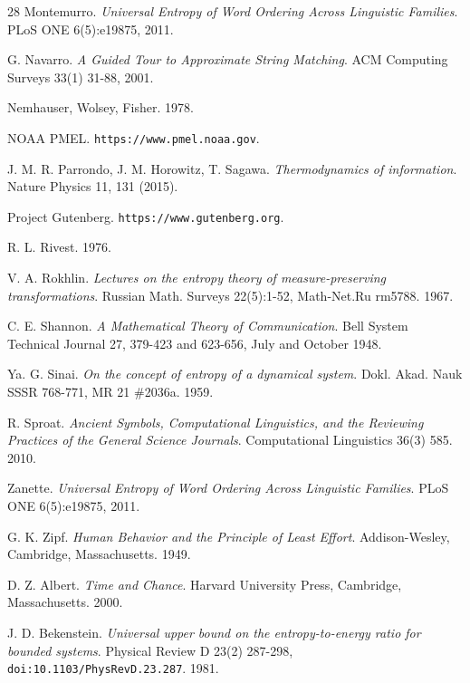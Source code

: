 \begin{thebibliography}{28}
Montemurro. \emph{Universal Entropy of Word Ordering Across Linguistic Families}. PLoS ONE 6(5):e19875, 2011.

G. Navarro. \emph{A Guided Tour to Approximate String Matching}. ACM Computing Surveys 33(1) 31-88, 2001.

Nemhauser, Wolsey, Fisher. 1978.

NOAA PMEL. \texttt{https:/\allowbreak{}/\allowbreak{}www.pmel.noaa.gov}.

J. M. R. Parrondo, J. M. Horowitz, T. Sagawa. \emph{Thermodynamics of information}. Nature Physics 11, 131 (2015).

Project Gutenberg. \texttt{https:/\allowbreak{}/\allowbreak{}www.gutenberg.org}.

R. L. Rivest. 1976.

V. A. Rokhlin. \emph{Lectures on the entropy theory of measure-preserving transformations}. Russian Math. Surveys 22(5):1-52, Math-Net.Ru rm5788. 1967.

C. E. Shannon. \emph{A Mathematical Theory of Communication}. Bell System Technical Journal 27, 379-423 and 623-656, July and October 1948.

Ya. G. Sinai. \emph{On the concept of entropy of a dynamical system}. Dokl. Akad. Nauk SSSR 768-771, MR 21 \#2036a. 1959.

R. Sproat. \emph{Ancient Symbols, Computational Linguistics, and the Reviewing Practices of the General Science Journals}. Computational Linguistics 36(3) 585. 2010.

Zanette. \emph{Universal Entropy of Word Ordering Across Linguistic Families}. PLoS ONE 6(5):e19875, 2011.

G. K. Zipf. \emph{Human Behavior and the Principle of Least Effort}. Addison-Wesley, Cambridge, Massachusetts. 1949.

D. Z. Albert. \emph{Time and Chance}. Harvard University Press, Cambridge, Massachusetts. 2000.

J. D. Bekenstein. \emph{Universal upper bound on the entropy-to-energy ratio for bounded systems}. Physical Review D 23(2) 287-298, \texttt{doi:10.1103/\allowbreak{}PhysRevD.23.287}. 1981.


\end{thebibliography}

